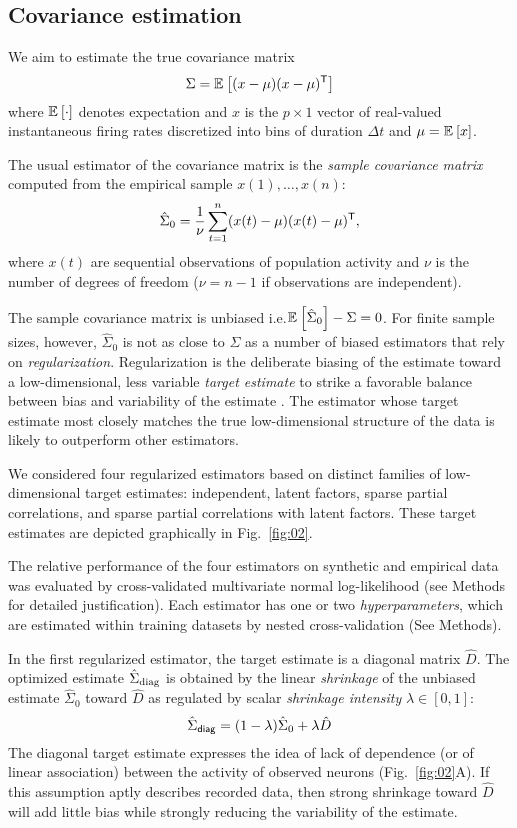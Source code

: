 
\subsection*{Covariance estimation}
We aim to estimate the true covariance matrix 
\begin{equation}
\Sigma = \mathbb E_{}\left[ (x-\mu)(x-\mu)^{\sf T}\right]
\end{equation}
where $\mathbb E_{}\left[ \cdot\right]$ denotes expectation  and $x$ is the $p\times 1$ vector of real-valued instantaneous firing rates discretized into bins of duration $\Delta t$ and $\mu = \mathbb E_{}\left[ x\right]$.  

The usual estimator of the covariance matrix is the \emph{sample covariance matrix} computed from the empirical sample  $x(1),\ldots,x(n)$:
\begin{equation}
\hat \Sigma_0 = \frac 1 \nu \sum\limits_{t=1}^n (x(t)-\mu)(x(t)-\mu)^{\sf T}, 
\end{equation}
where $x(t)$ are sequential observations of population activity and $\nu$ is the number of degrees of freedom ($\nu=n-1$ if observations are independent).

The sample covariance matrix is unbiased i.e.\;$\mathbb E_{}\left[ \hat\Sigma_0\right]-\Sigma=0$.  For finite sample sizes, however, $\hat\Sigma_0$ is not as close to $\Sigma$ as a number of biased estimators that rely on \emph{regularization}. Regularization is the deliberate biasing of the estimate toward a low-dimensional, less variable \emph{target estimate} to strike a favorable balance between bias and variability of the estimate \cite{Bickel:2006,Ledoit:2004}.  The estimator whose target estimate most closely matches the true low-dimensional structure of the data is likely to outperform other estimators.

We considered four regularized estimators based on distinct families of low-dimensional target estimates: independent, latent factors, sparse partial correlations, and sparse partial correlations with latent factors. These target estimates are depicted graphically in Fig.~\ref{fig:02}.  



The relative performance of the four estimators on synthetic and empirical data was evaluated by cross-validated multivariate normal log-likelihood (see Methods for detailed justification).  
Each estimator has one or two \emph{hyperparameters}, which are estimated within training datasets by nested cross-validation (See Methods). 

In the first regularized estimator, the target estimate is a diagonal matrix $\hat D$.  The optimized estimate $\hat\Sigma_{\rm diag}$ is obtained by the linear \emph{shrinkage} of the unbiased estimate $\hat\Sigma_0$ toward $\hat D$ as regulated by scalar \emph{shrinkage intensity} $\lambda \in [0, 1]$:
\begin{equation}
\hat \Sigma_{\sf diag} = (1-\lambda) \hat \Sigma_0 + \lambda \hat D
\end{equation}
The diagonal target estimate expresses the idea of lack of dependence (or of linear association) between the activity of observed neurons (Fig.~\ref{fig:02}A).  If this assumption aptly describes recorded data, then strong shrinkage toward $\hat D$ will add little bias while strongly reducing the variability of the estimate. 


